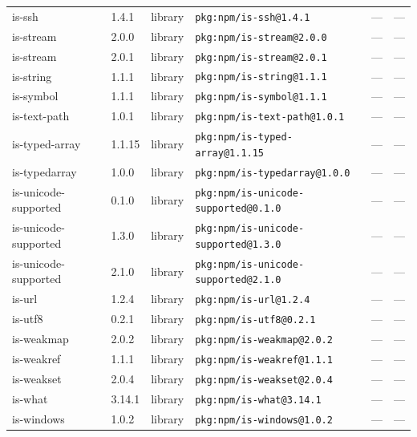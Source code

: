 \documentclass[11pt,a4paper]{article}
\begin{document}
\begin{longtable}{|p{4cm}|p{2cm}|p{1.6cm}|p{5cm}|p{1.5cm}|p{3.5cm}|}
\raggedright is-ssh & 1.4.1 & library & \small\texttt{pkg:npm/is-ssh@1.4.1} & — & \small — \\
\raggedright is-stream & 2.0.0 & library & \small\texttt{pkg:npm/is-stream@2.0.0} & — & \small — \\
\raggedright is-stream & 2.0.1 & library & \small\texttt{pkg:npm/is-stream@2.0.1} & — & \small — \\
\raggedright is-string & 1.1.1 & library & \small\texttt{pkg:npm/is-string@1.1.1} & — & \small — \\
\raggedright is-symbol & 1.1.1 & library & \small\texttt{pkg:npm/is-symbol@1.1.1} & — & \small — \\
\raggedright is-text-path & 1.0.1 & library & \small\texttt{pkg:npm/is-text-path@1.0.1} & — & \small — \\
\raggedright is-typed-array & 1.1.15 & library & \small\texttt{pkg:npm/is-typed-array@1.1.15} & — & \small — \\
\raggedright is-typedarray & 1.0.0 & library & \small\texttt{pkg:npm/is-typedarray@1.0.0} & — & \small — \\
\raggedright is-unicode-supported & 0.1.0 & library & \small\texttt{pkg:npm/is-unicode-supported@0.1.0} & — & \small — \\
\raggedright is-unicode-supported & 1.3.0 & library & \small\texttt{pkg:npm/is-unicode-supported@1.3.0} & — & \small — \\
\raggedright is-unicode-supported & 2.1.0 & library & \small\texttt{pkg:npm/is-unicode-supported@2.1.0} & — & \small — \\
\raggedright is-url & 1.2.4 & library & \small\texttt{pkg:npm/is-url@1.2.4} & — & \small — \\
\raggedright is-utf8 & 0.2.1 & library & \small\texttt{pkg:npm/is-utf8@0.2.1} & — & \small — \\
\raggedright is-weakmap & 2.0.2 & library & \small\texttt{pkg:npm/is-weakmap@2.0.2} & — & \small — \\
\raggedright is-weakref & 1.1.1 & library & \small\texttt{pkg:npm/is-weakref@1.1.1} & — & \small — \\
\raggedright is-weakset & 2.0.4 & library & \small\texttt{pkg:npm/is-weakset@2.0.4} & — & \small — \\
\raggedright is-what & 3.14.1 & library & \small\texttt{pkg:npm/is-what@3.14.1} & — & \small — \\
\raggedright is-windows & 1.0.2 & library & \small\texttt{pkg:npm/is-windows@1.0.2} & — & \small — \\

\end{longtable}
\end{document}

